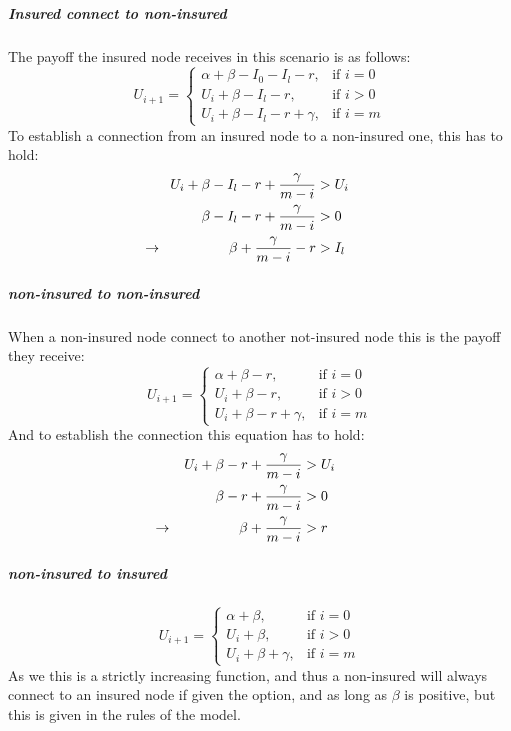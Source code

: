 \subparagraph{Insured connect to non-insured}
The payoff the insured node receives in this scenario is as follows:
\begin{equation}
    U_{i+1}= 
\begin{cases}
    \alpha + \beta - I_{0} - I_{l} -r,& \text{if } i = 0\\
    U_{i}+\beta -I_{l}-r,& \text{if }  i>0\\
    U_{i}+\beta -I_{l}-r+\gamma,& \text{if } i=m
\end{cases}
\label{eq:itonoti}
\end{equation}
To establish a connection from an insured node to a non-insured one, this has to hold:
\begin{eqnarray}
U_{i}+\beta-I_{l}-r+\frac{\gamma}{m-i}&>U_{i} \nonumber \\ 
\beta-I_{l}-r+\frac{\gamma}{m-i}&>0 \nonumber \\ 
\llap{$\rightarrow$\hspace{50pt}} \beta+\frac{\gamma}{m-i}-r&>I_{l} 
\end{eqnarray}
\subparagraph{non-insured to non-insured}
When a non-insured node connect to another not-insured node this is the payoff they receive:
\begin{equation}
    U_{i+1}= 
\begin{cases}
    \alpha + \beta -r,& \text{if } i = 0\\
    U_{i}+\beta -r,& \text{if }  i>0\\
    U_{i}+\beta -r +\gamma,& \text{if } i=m
\end{cases}
\end{equation}
And to establish the connection this equation has to hold:
\begin{eqnarray}
U_{i}+\beta-r+\frac{\gamma}{m-i}&>U_{i} \nonumber \\ 
\beta-r+\frac{\gamma}{m-i}&>0 \nonumber \\ 
\llap{$\rightarrow$\hspace{50pt}} \beta+\frac{\gamma}{m-i}&>r
\end{eqnarray}
\subparagraph{non-insured to insured}
\begin{equation}
    U_{i+1}= 
\begin{cases}
    \alpha + \beta,& \text{if } i = 0\\
    U_{i}+\beta,& \text{if }  i>0\\
    U_{i}+\beta +\gamma,& \text{if } i=m
\end{cases}
\end{equation}
As we this is a strictly increasing function, and thus a non-insured will always connect to an insured node if given the option, and as long as $\beta$ is positive, but this is given in the rules of the model.
